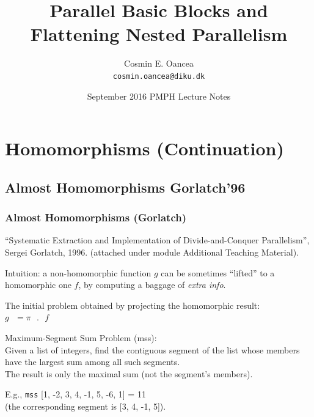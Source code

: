 \documentclass{beamer}
\title[Intro]{Parallel Basic Blocks and\\ Flattening Nested Parallelism}
\author[C.~Oancea]{Cosmin E. Oancea\\{\tt cosmin.oancea@diku.dk}}
\institute{Department of Computer Science (DIKU)\\University of Copenhagen}
\date[Sept 2016]{September 2016 PMPH Lecture Notes}
\renewcommand{\emph}[1]{\textcolor{structure}{#1}}
\newcommand{\emp}[1]{\textcolor{DikuRed}{ #1}}
\begin{document}
\titleslide


\begin{frame}[fragile]
	\tableofcontents
\end{frame}


\section{Homomorphisms (Continuation)}

\subsection{Almost Homomorphisms Gorlatch'96}


\begin{frame}[fragile,t]
  \frametitle{Almost Homomorphisms (Gorlatch)}

\emp{``Systematic Extraction and Implementation of Divide-and-Conquer Parallelism'', Sergei Gorlatch, 1996.} 
(attached under module Additional Teaching Material).
\bigskip

\emph{Intuition}: a non-homomorphic function $g$ can be sometimes ``lifted'' 
to a homomorphic one $f$, by computing a baggage of \emp{\em extra info}. 

\bigskip

The initial problem obtained by projecting the homomorphic result:\\
$g\mbox{ }=\pi\mbox{ }.\mbox{ }f$

\bigskip

\emp{Maximum-Segment Sum Problem ({\sc mss})}: \\
Given a list of integers, find the contiguous segment of the list 
whose members have the largest sum among all such segments.\\
The result is only the maximal sum (not the segment's members).

\bigskip

E.g., {\tt mss} [1, -2, 3, 4, -1, 5, -6, 1] = 11 \\
(the corresponding segment is [3, 4, -1, 5]). 

\end{frame}
\end{document}
